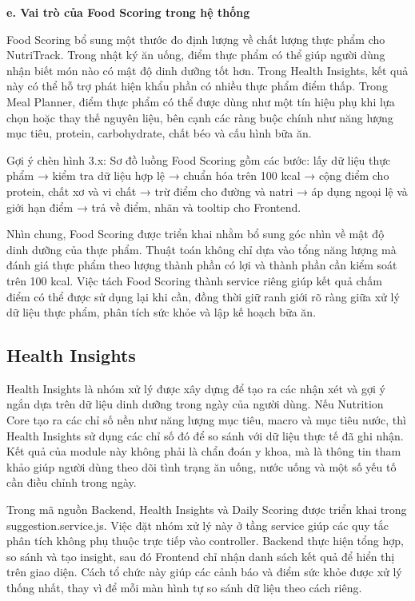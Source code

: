 \documentclass[12pt, a4paper]{report}
\begin{document}
\textbf{e. Vai trò của Food Scoring trong hệ thống}

Food Scoring bổ sung một thước đo định lượng về chất lượng thực phẩm cho NutriTrack. Trong nhật ký ăn uống, điểm thực phẩm có thể giúp người dùng nhận biết món nào có mật độ dinh dưỡng tốt hơn. Trong Health Insights, kết quả này có thể hỗ trợ phát hiện khẩu phần có nhiều thực phẩm điểm thấp. Trong Meal Planner, điểm thực phẩm có thể được dùng như một tín hiệu phụ khi lựa chọn hoặc thay thế nguyên liệu, bên cạnh các ràng buộc chính như năng lượng mục tiêu, protein, carbohydrate, chất béo và cấu hình bữa ăn.

Gợi ý chèn hình 3.x: Sơ đồ luồng Food Scoring gồm các bước: lấy dữ liệu thực phẩm → kiểm tra dữ liệu hợp lệ → chuẩn hóa trên 100 kcal → cộng điểm cho protein, chất xơ và vi chất → trừ điểm cho đường và natri → áp dụng ngoại lệ và giới hạn điểm → trả về điểm, nhãn và tooltip cho Frontend.

Nhìn chung, Food Scoring được triển khai nhằm bổ sung góc nhìn về mật độ dinh dưỡng của thực phẩm. Thuật toán không chỉ dựa vào tổng năng lượng mà đánh giá thực phẩm theo lượng thành phần có lợi và thành phần cần kiểm soát trên 100 kcal. Việc tách Food Scoring thành service riêng giúp kết quả chấm điểm có thể được sử dụng lại khi cần, đồng thời giữ ranh giới rõ ràng giữa xử lý dữ liệu thực phẩm, phân tích sức khỏe và lập kế hoạch bữa ăn.
\subsection{Health Insights}Health Insights là nhóm xử lý được xây dựng để tạo ra các nhận xét và gợi ý ngắn dựa trên dữ liệu dinh dưỡng trong ngày của người dùng. Nếu Nutrition Core tạo ra các chỉ số nền như năng lượng mục tiêu, macro và mục tiêu nước, thì Health Insights sử dụng các chỉ số đó để so sánh với dữ liệu thực tế đã ghi nhận. Kết quả của module này không phải là chẩn đoán y khoa, mà là thông tin tham khảo giúp người dùng theo dõi tình trạng ăn uống, nước uống và một số yếu tố cần điều chỉnh trong ngày.

Trong mã nguồn Backend, Health Insights và Daily Scoring được triển khai trong suggestion.service.js. Việc đặt nhóm xử lý này ở tầng service giúp các quy tắc phân tích không phụ thuộc trực tiếp vào controller. Backend thực hiện tổng hợp, so sánh và tạo insight, sau đó Frontend chỉ nhận danh sách kết quả để hiển thị trên giao diện. Cách tổ chức này giúp các cảnh báo và điểm sức khỏe được xử lý thống nhất, thay vì để mỗi màn hình tự so sánh dữ liệu theo cách riêng.
\end{document}
